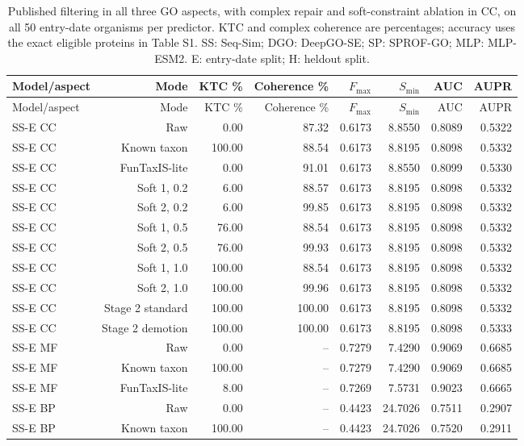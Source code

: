 \begingroup\scriptsize
\setlength{\tabcolsep}{4pt}
\begin{longtable}{lrrrrrrr}
\caption{Published filtering in all three GO aspects, with complex repair and soft-constraint ablation in CC, on all 50 entry-date organisms per predictor. KTC and complex coherence are percentages; accuracy uses the exact eligible proteins in Table S1. SS: Seq-Sim; DGO: DeepGO-SE; SP: SPROF-GO; MLP: MLP-ESM2. E: entry-date split; H: heldout split.}\label{tab:supp-comparators}\\
\toprule
Model/aspect & Mode & KTC \% & Coherence \% & $F_{\max}$ & $S_{\min}$ & AUC & AUPR \\
\midrule
\endfirsthead
\toprule
Model/aspect & Mode & KTC \% & Coherence \% & $F_{\max}$ & $S_{\min}$ & AUC & AUPR \\
\midrule
\endhead
SS-E CC & Raw & 0.00 & 87.32 & 0.6173 & 8.8550 & 0.8089 & 0.5322 \\
SS-E CC & Known taxon & 100.00 & 88.54 & 0.6173 & 8.8195 & 0.8098 & 0.5332 \\
SS-E CC & FunTaxIS-lite & 0.00 & 91.01 & 0.6173 & 8.8550 & 0.8099 & 0.5330 \\
SS-E CC & Soft 1, 0.2 & 6.00 & 88.57 & 0.6173 & 8.8195 & 0.8098 & 0.5332 \\
SS-E CC & Soft 2, 0.2 & 6.00 & 99.85 & 0.6173 & 8.8195 & 0.8098 & 0.5332 \\
SS-E CC & Soft 1, 0.5 & 76.00 & 88.54 & 0.6173 & 8.8195 & 0.8098 & 0.5332 \\
SS-E CC & Soft 2, 0.5 & 76.00 & 99.93 & 0.6173 & 8.8195 & 0.8098 & 0.5332 \\
SS-E CC & Soft 1, 1.0 & 100.00 & 88.54 & 0.6173 & 8.8195 & 0.8098 & 0.5332 \\
SS-E CC & Soft 2, 1.0 & 100.00 & 99.96 & 0.6173 & 8.8195 & 0.8098 & 0.5332 \\
SS-E CC & Stage 2 standard & 100.00 & 100.00 & 0.6173 & 8.8195 & 0.8098 & 0.5332 \\
SS-E CC & Stage 2 demotion & 100.00 & 100.00 & 0.6173 & 8.8195 & 0.8098 & 0.5333 \\
SS-E MF & Raw & 0.00 & -- & 0.7279 & 7.4290 & 0.9069 & 0.6685 \\
SS-E MF & Known taxon & 100.00 & -- & 0.7279 & 7.4290 & 0.9069 & 0.6685 \\
SS-E MF & FunTaxIS-lite & 8.00 & -- & 0.7269 & 7.5731 & 0.9023 & 0.6665 \\
SS-E BP & Raw & 0.00 & -- & 0.4423 & 24.7026 & 0.7511 & 0.2907 \\
SS-E BP & Known taxon & 100.00 & -- & 0.4423 & 24.7026 & 0.7520 & 0.2911 \\

\end{longtable}
